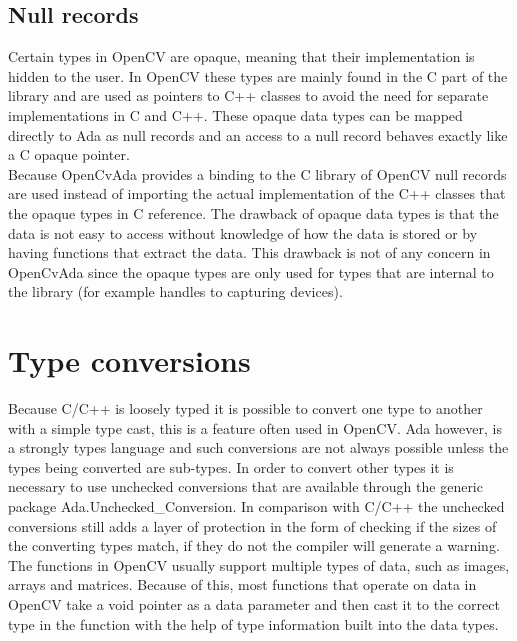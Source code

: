 \subsection{Null records}
Certain types in OpenCV are opaque, meaning that their implementation is hidden to the user. In OpenCV these types are mainly found in the C part of the library and are used as pointers to C++ classes to avoid the need for separate implementations in C and C++. These opaque data types can be mapped directly to Ada as null records and an access to a null record behaves exactly like a C opaque pointer.
\\
Because OpenCvAda provides a binding to the C library of OpenCV null records are used instead of importing the actual implementation of the C++ classes that the opaque types in C reference.
The drawback of opaque data types is that the data is not easy to access without knowledge of how the data is stored or by having functions that extract the data. This drawback is not of any concern in OpenCvAda since the opaque types are only used for types that are internal to the library (for example handles to capturing devices).
\section{Type conversions}\label{sec:typeconv}
Because C/C++ is loosely typed it is possible to convert one type to another with a simple type cast, this is a feature often used in OpenCV. Ada however, is a strongly types language and such conversions are not always possible unless the types being converted are sub-types. In order to convert other types it is necessary to use unchecked conversions that are available through the generic package Ada.Unchecked_Conversion. In comparison with C/C++ the unchecked conversions still adds a layer of protection in the form of checking if the sizes of the converting types match, if they do not the compiler will generate a warning.
\\
The functions in OpenCV usually support multiple types of data, such as images, arrays and matrices. Because of this, most functions that operate on data in OpenCV take a void pointer as a data parameter and then cast it to the correct type in the function with the help of type information built into the data types.
